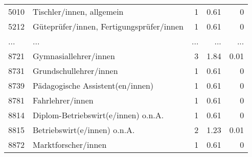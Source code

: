 \begin{longtable}{lXrrr}
        5010 & \multicolumn{1}{X}{Tischler/innen, allgemein} & %
          \num{1} &
          \num[round-mode=places,round-precision=2]{0.61} &
          \num[round-mode=places,round-precision=2]{0} \\
        5212 & \multicolumn{1}{X}{Güteprüfer/innen, Fertigungsprüfer/innen} & %
          \num{1} &
          \num[round-mode=places,round-precision=2]{0.61} &
          \num[round-mode=places,round-precision=2]{0} \\
       ... & ... & ... & ... & ... \\
        8721 & \multicolumn{1}{X}{Gymnasiallehrer/innen} & %
          \num{3} &
          \num[round-mode=places,round-precision=2]{1.84} &
          \num[round-mode=places,round-precision=2]{0.01} \\

        8731 & \multicolumn{1}{X}{Grundschullehrer/innen} & %
          \num{1} &
          \num[round-mode=places,round-precision=2]{0.61} &
          \num[round-mode=places,round-precision=2]{0} \\

        8739 & \multicolumn{1}{X}{Pädagogische Assistent(en/innen)} & %
          \num{1} &
          \num[round-mode=places,round-precision=2]{0.61} &
          \num[round-mode=places,round-precision=2]{0} \\

        8781 & \multicolumn{1}{X}{Fahrlehrer/innen} & %
          \num{1} &
          \num[round-mode=places,round-precision=2]{0.61} &
          \num[round-mode=places,round-precision=2]{0} \\

        8814 & \multicolumn{1}{X}{Diplom-Betriebswirt(e/innen) o.n.A.} & %
          \num{1} &
          \num[round-mode=places,round-precision=2]{0.61} &
          \num[round-mode=places,round-precision=2]{0} \\

        8815 & \multicolumn{1}{X}{Betriebswirt(e/innen) o.n.A.} & %
          \num{2} &
          \num[round-mode=places,round-precision=2]{1.23} &
          \num[round-mode=places,round-precision=2]{0.01} \\

        8872 & \multicolumn{1}{X}{Marktforscher/innen} & %
          \num{1} &
          \num[round-mode=places,round-precision=2]{0.61} &
          \num[round-mode=places,round-precision=2]{0} \\


\end{longtable}
